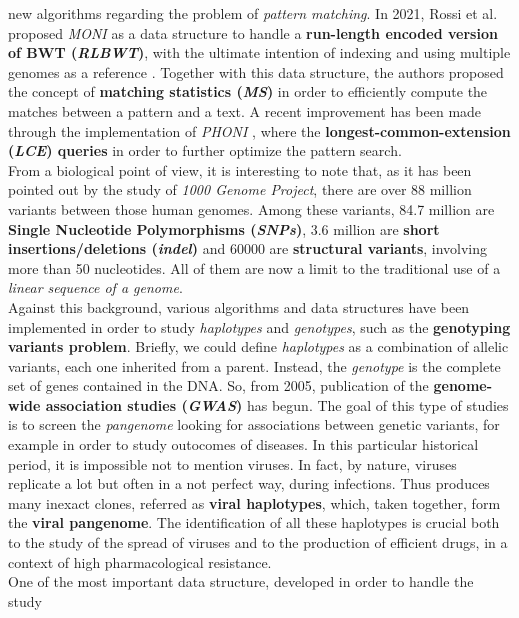\documentclass[a4paper,11pt, oneside]{article}
\begin{document}
new algorithms regarding the problem of \textit{pattern matching}. In 2021,
Rossi et al. proposed \textit{MONI} as a data structure to handle a 
\textbf{run-length encoded version of BWT (\textit{RLBWT})}, with the ultimate
intention of indexing and using multiple genomes as a reference
\cite{moni}. Together with this data structure, the authors proposed the concept
of \textbf{matching statistics (\textit{MS})} in order to efficiently compute
the matches between a pattern and a text. A recent improvement has been made
through the implementation of \textit{PHONI} \cite{phoni}, where the
\textbf{longest-common-extension (\textit{LCE}) queries} in order to further
optimize the pattern search.\\ 
From a biological point of view, it is interesting to note that, as it has been
pointed out by the study of \textit{1000 Genome Project}, there are over 88
million variants between those human genomes. Among these variants, 84.7 million
are \textbf{Single 
  Nucleotide Polymorphisms (\textit{SNPs})}, 3.6 million are \textbf{short
  insertions/deletions (\textit{indel})} and 60000 are \textbf{structural
  variants}, 
involving more than 
50 nucleotides. All of them are now a limit to the traditional use of a
\textit{linear sequence of a genome}.\\
Against this background, various algorithms and data structures have
been implemented in order to study \textit{haplotypes} and
\textit{genotypes}, such as the \textbf{genotyping variants
  problem}. Briefly, we could define \textit{haplotypes} as a combination 
of allelic variants, each one inherited from a parent. Instead, the
\textit{genotype} is the complete set of genes contained in the DNA. So, from
2005, publication of the \textbf{genome-wide association studies
  (\textit{GWAS})} has begun. The goal of this type of studies is to screen the 
\textit{pangenome} looking for associations between genetic variants, for
example in order to study outocomes of diseases.
In this particular historical period, it is impossible not to mention
viruses. In fact, by nature, viruses replicate a lot but
often in a not perfect way, during infections. Thus produces many inexact
clones, referred as 
\textbf{viral haplotypes}, which, taken together, form the \textbf{viral
  pangenome}. The identification of all these haplotypes is crucial both to the
study of the spread of viruses and to the production of efficient
drugs, in a context of high pharmacological resistance. \\
One of the most important data structure, developed in order to handle the study
\end{document}
